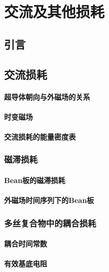\chapter{交流及其他损耗}
\section{引言}

\section{交流损耗}
\subsubsection*{超导体朝向与外磁场的关系}

\subsubsection*{时变磁场}

\subsubsection*{交流损耗的能量密度表}

\subsection{磁滞损耗}
\subsubsection*{Bean板的磁滞损耗}

\subsubsection*{外磁场时间序列下的Bean板}

\subsection{多丝复合物中的耦合损耗}

\subsubsection*{耦合时间常数}

\subsubsection*{有效基底电阻}


